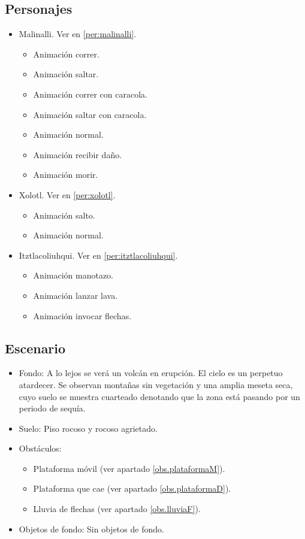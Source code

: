 	\subsection{Personajes}
	\begin{itemize}
		\item Malinalli. Ver en \ref{per:malinalli}.
		\begin{itemize}
			\item Animación correr.
			\item Animación saltar.
			\item Animación correr con caracola.
			\item Animación saltar con caracola.
			\item Animación normal.
			\item Animación recibir daño.
			\item Animación morir.
		\end{itemize}
		\item Xolotl. Ver en \ref{per:xolotl}.
		\begin{itemize}
				\item Animación salto.
				\item Animación normal.
		\end{itemize}
		\item Itztlacoliuhqui. Ver en \ref{per:itztlacoliuhqui}.
		\begin{itemize}
			\item Animación manotazo.
			\item Animación lanzar lava.
			\item Animación invocar flechas.
		\end{itemize}
	\end{itemize}
	\subsection{Escenario}
\begin{itemize} 
	\item Fondo: A lo lejos se verá un volcán en erupción. El cielo es un perpetuo atardecer. Se observan montañas sin vegetación y una amplia meseta seca, cuyo suelo se muestra cuarteado denotando que la zona está pasando por un periodo de sequía. 
	\item Suelo: Piso rocoso y rocoso agrietado.
	\item Obstáculos:
	\begin{itemize}
	\item Plataforma móvil (ver apartado \ref{obs.plataformaM}).
			\item Plataforma que cae (ver apartado \ref{obs.plataformaD}).
			\item Lluvia de flechas (ver apartado \ref{obs.lluviaF}).
\end{itemize}	 
	
	\item Objetos de fondo: Sin objetos de fondo.
\end{itemize}	
